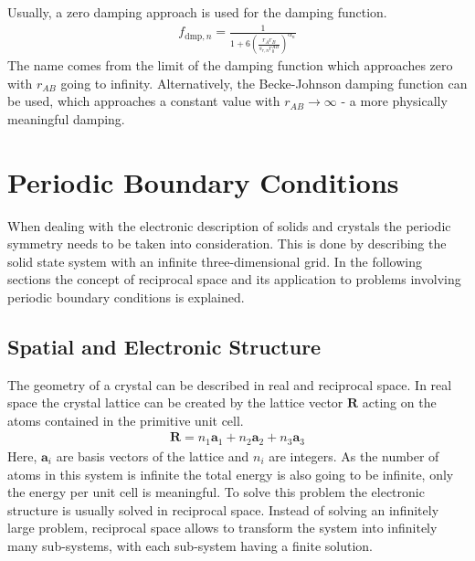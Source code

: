 Usually, a zero damping approach is used for the damping function.
%
\begin{align}
	f_{\text{dmp},n} = \frac{1}{1+6\left( \frac{r_Ar_B}{s_{r,n}r_0^{AB}} \right)^{\alpha_n}}
\end{align}
%
The name comes from the limit of the damping function which approaches zero
with $r_{AB}$ going to infinity. Alternatively, the Becke-Johnson damping
function\autocite{Grimme_Effectdampingfunction_2011} can be used, which
approaches a constant value with $r_{AB}\to\infty$ - a more physically
meaningful damping.

\section{Periodic Boundary Conditions}
\label{sec:PBC}

When dealing with the electronic description of solids and crystals the
periodic symmetry needs to be taken into consideration. This is done by
describing the solid state system with an infinite three-dimensional grid. In
the following sections the concept of reciprocal space and its application to
problems involving periodic boundary conditions is explained.

\subsection{Spatial and Electronic Structure}
\label{sec:SpatialandElectronicStructure}

The geometry of a crystal can be described in real and reciprocal space. In real
space the crystal lattice can be created by the lattice vector
$\mathbf{R}$ acting on the atoms contained in the primitive unit cell.
%
\begin{align}
    \mathbf{R}=n_1\mathbf{a}_1+n_2\mathbf{a}_2+n_3\mathbf{a}_3    
\end{align}
%
Here, $\mathbf{a}_i$ are basis vectors of the lattice and $n_i$ are integers.
As the number of atoms in this system is infinite the total energy is also
going to be infinite, only the energy per unit cell is meaningful. To solve
this problem the electronic structure is usually solved in reciprocal space.
Instead of solving an infinitely large problem, reciprocal space allows to
transform the system into infinitely many sub-systems, with each sub-system
having a finite solution. 

